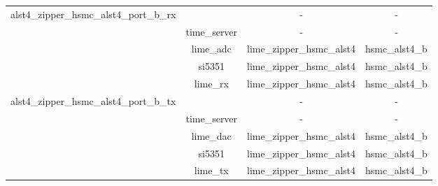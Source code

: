 \begin{tabular}{|c|c|c|c|}
	\hline
	\multirow{5}{*}{alst4\_zipper\_hsmc\_alst4\_port\_b\_rx}&
	\comp & - & - \\ &time\_server & - & - \\ &lime\_adc &
	lime\_zipper\_hsmc\_alst4 & hsmc\_alst4\_b \\  &si5351 &
	lime\_zipper\_hsmc\_alst4 & hsmc\_alst4\_b \\ &lime\_rx &
	lime\_zipper\_hsmc\_alst4 & hsmc\_alst4\_b \\
	\hline
	\multirow{5}{*}{alst4\_zipper\_hsmc\_alst4\_port\_b\_tx}&
	\comp & - & - \\ &time\_server & - & - \\ &lime\_dac &
	lime\_zipper\_hsmc\_alst4 & hsmc\_alst4\_b \\  &si5351 &
	lime\_zipper\_hsmc\_alst4 & hsmc\_alst4\_b \\ &lime\_tx &
	lime\_zipper\_hsmc\_alst4 & hsmc\_alst4\_b \\
	\hline
\end{tabular}

\newpage
